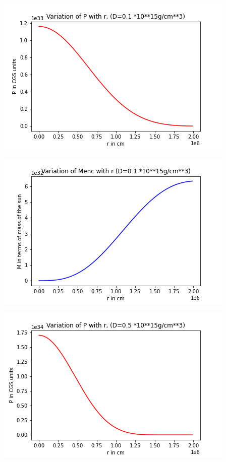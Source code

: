 \documentclass{article}
\begin{document}
 \begin{center}
\begin{multicols}{2}
	\begin{center}
        \includegraphics[scale=0.3]{Images/Pr_pb2_0}
        \end{center}
\columnbreak
       \includegraphics[scale=0.3]{Images/Mr_pb2_0}
\end{multicols}
\begin{multicols}{2}
	\begin{center}
        \includegraphics[scale=0.3]{Images/Pr_pb2_1}

\end{center}
\end{multicols}
\end{center}
\end{document}

